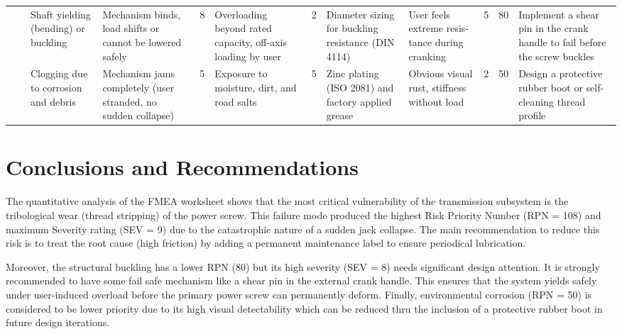 \documentclass[11pt, a4paper]{article}
\begin{document}
\begin{table}[htbp]
{\begin{tabular}{|P{1.2cm}|P{1.6cm}|P{1.8cm}|P{1.8cm}|c|P{1.8cm}|c|P{1.6cm}|P{1.6cm}|c|c|P{2.0cm}|}
        & & 
        Shaft yielding (bending) or buckling & 
        Mechanism binds, load shifts or cannot be lowered safely & 
        8 & 
        Overloading beyond rated capacity, off-axis loading by user & 
        2 & 
        Diameter sizing for buckling resistance (DIN 4114) \cite{din4114} & 
        User feels extreme resis- \newline tance during cranking & 
        5 & 
        80 & 
        Implement a shear pin in the crank handle to fail before the screw buckles \\ 
        
        & & 
        Clogging due to corrosion and debris & 
        Mechanism jams completely (user stranded, no sudden collapse) & 
        5 & 
        Exposure to moisture, dirt, and road salts & 
        5 & 
        Zinc plating (ISO 2081) \cite{iso2081} and factory applied grease & 
        Obvious visual rust, stiffness without load & 
        2 & 
        50 & 
        Design a protective rubber boot or self-cleaning thread profile \\ \hline
        
        \end{tabular}
    }
    \label{tab:fmea}
\end{table}

\section{Conclusions and Recommendations}

The quantitative analysis of the FMEA worksheet shows that the most critical vulnerability of the transmission subsystem is the tribological wear (thread stripping) of the power screw. This failure mode produced the highest Risk Priority Number (RPN = 108) and maximum Severity rating (SEV = 9) due to the catastrophic nature of a sudden jack collapse. The main recommendation to reduce this risk is to treat the root cause (high friction) by adding a permanent maintenance label to ensure periodical lubrication. 

Moreover, the structural buckling has a lower RPN (80) but its high severity (SEV = 8) needs significant design attention. It is strongly recommended to have some fail safe mechanism like a shear pin in the external crank handle. This ensures that the system yields safely under user-induced overload before the primary power screw can permanently deform. Finally, environmental corrosion (RPN = 50) is considered to be lower priority due to its high visual detectability which can be reduced thru the inclusion of a protective rubber boot in future design iterations.
\end{document}
